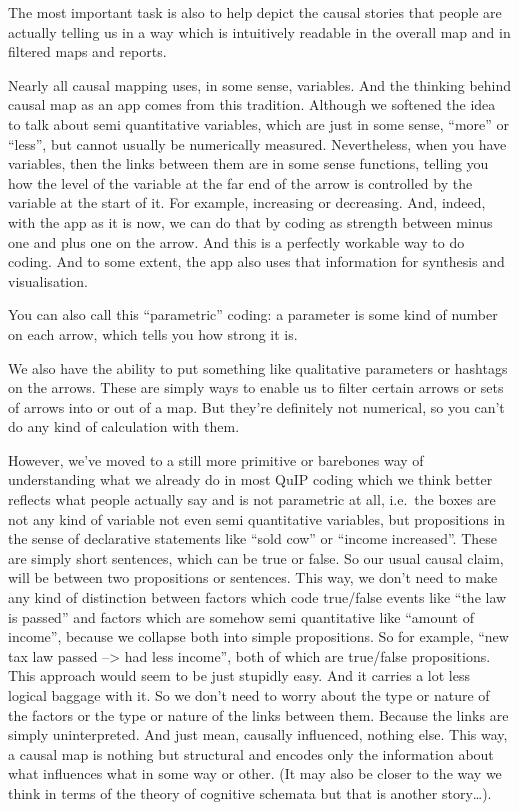 \documentclass[
]{book}
\begin{document}
The most important task is also to help depict the causal stories that people are actually telling us in a way which is intuitively readable in the overall map and in filtered maps and reports.

Nearly all causal mapping uses, in some sense, variables. And the thinking behind causal map as an app comes from this tradition. Although we softened the idea to talk about semi quantitative variables, which are just in some sense, ``more'' or ``less'', but cannot usually be numerically measured. Nevertheless, when you have variables, then the links between them are in some sense functions, telling you how the level of the variable at the far end of the arrow is controlled by the variable at the start of it. For example, increasing or decreasing. And, indeed, with the app as it is now, we can do that by coding as strength between minus one and plus one on the arrow. And this is a perfectly workable way to do coding. And to some extent, the app also uses that information for synthesis and visualisation.

You can also call this ``parametric'' coding: a parameter is some kind of number on each arrow, which tells you how strong it is.

We also have the ability to put something like qualitative parameters or hashtags on the arrows. These are simply ways to enable us to filter certain arrows or sets of arrows into or out of a map. But they're definitely not numerical, so you can't do any kind of calculation with them.

However, we've moved to a still more primitive or barebones way of understanding what we already do in most QuIP coding
which we think better reflects what people actually say and is not parametric at all, i.e.~the boxes are not any kind of variable not even semi quantitative variables, but propositions in the sense of declarative statements like ``sold cow'' or ``income increased''. These are simply short sentences, which can be true or false. So our usual causal claim, will be between
two propositions or sentences. This way, we don't need to make any kind of distinction between factors which
code true/false events like ``the law is passed'' and factors which are somehow semi quantitative like ``amount of income'', because we collapse both into simple propositions. So for example, ``new tax law passed --\textgreater{} had less income'', both of which are true/false propositions. This approach would seem to be just stupidly easy. And it carries a lot less logical baggage with it. So we don't need to worry about the type or nature of the factors or the type or nature of the links between them. Because the links are simply uninterpreted. And just mean, causally influenced, nothing else. This way, a causal map is nothing but structural and encodes only the information about what influences what in some way or other. (It may also be closer to the way we think in terms of the theory of cognitive schemata but that is another story\ldots).
\end{document}
